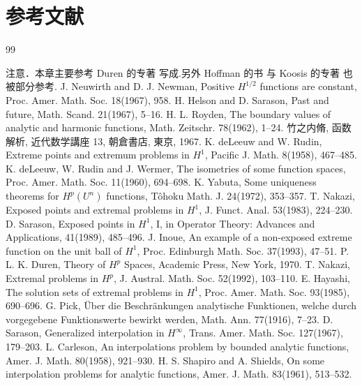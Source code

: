\section*{参考文献}
\begin{thebibliography}{99}
\item[] 注意．本章主要参考 Duren 的专著 \cite{ch2:11} 写成.另外 Hoffman 的书 \cite{ch2:22} 与 Koosis 的专著 \cite{ch2:23} 也被部分参考.
 J. Neuwirth and D. J. Newman, Positive $H^{1/2}$ functions are constant, Proc. Amer. Math. Soc. 18(1967), 958.
 H. Helson and D. Sarason, Past and future, Math. Scand. 21(1967), 5--16.
 H. L. Royden, The boundary values of analytic and harmonic functions, Math. Zeitschr. 78(1962), 1--24.
 竹之内脩, 函数解析, 近代数学講座 13, 朝倉書店, 東京, 1967.
 K. deLeeuw and W. Rudin, Extreme points and extremum problems in $H^{1}$, Pacific J. Math. 8(1958), 467--485.
 K. deLeeuw, W. Rudin and J. Wermer, The isometries of some function spaces, Proc. Amer. Math. Soc. 11(1960), 694--698.
 K. Yabuta, Some uniqueness theorems for $H^{p}(U^{n})$ functions, Tôhoku Math. J. 24(1972), 353--357.
 T. Nakazi, Exposed points and extremal problems in $H^{1}$, J. Funct. Anal. 53(1983), 224--230.
 D. Sarason, Exposed points in $H^{1}$, I, in Operator Theory: Advances and Applications, 41(1989), 485--496.
 J. Inoue, An example of a non-exposed extreme function on the unit ball of $H^{1}$, Proc. Edinburgh Math. Soc. 37(1993), 47--51.
 P. L. K. Duren, Theory of $H^{p}$ Spaces, Academic Press, New York, 1970.
 T. Nakazi, Extremal problems in $H^{p}$, J. Austral. Math. Soc. 52(1992), 103--110.
 E. Hayashi, The solution sets of extremal problems in $H^{1}$, Proc. Amer. Math. Soc. 93(1985), 690--696.
 G. Pick, Über die Beschränkungen analytische Funktionen, welche durch vorgegebene Funktionswerte bewirkt werden, Math. Ann. 77(1916), 7--23.
 D. Sarason, Generalized interpolation in $H^{\infty}$, Trans. Amer. Math. Soc. 127(1967), 179--203.
 L. Carleson, An interpolations problem by bounded analytic functions, Amer. J. Math. 80(1958), 921--930.
 H. S. Shapiro and A. Shields, On some interpolation problems for analytic functions, Amer. J. Math. 83(1961), 513--532.

\end{thebibliography}
